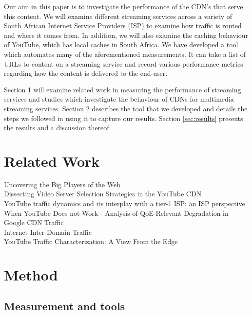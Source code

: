 \documentclass{sig-alternate-05-2015}
\begin{document}
Our aim in this paper is to investigate the performance of the CDN's that serve this content. We will examine different streaming services across a variety of South African Internet Service Providers (ISP) to examine how traffic is routed and where it comes from. In addition, we will also examine the caching behaviour of YouTube, which has local caches in South Africa. We have developed a tool which automates many of the aforementioned measurements. It can take a list of URLs to content on a streaming service and record various performance metrics regarding how the content is delivered to the end-user.

Section \ref{sec:related} will examine related work in measuring the performance of streaming services and studies which investigate the behaviour of CDNs for multimedia streaming services. Section \ref{sec:method} describes the tool that we developed and details the steps we followed in using it to capture our results. Section \ref{sec:results} presents the results and a discussion thereof.



\section{Related Work}\label{sec:related}
Uncovering the Big Players of the Web\\
Dissecting Video Server Selection Strategies
in the YouTube CDN\\
YouTube traffic dynamics and its interplay with a tier-1 ISP: an ISP perspective\\
When YouTube Does not Work - Analysis of QoE-Relevant Degradation in Google CDN Traffic\\
Internet Inter-Domain Traffic\\
YouTube Traffic Characterization: A View From the Edge\\


\section{Method}\label{sec:method}
\subsection{Measurement and tools}
%
%
\end{document}
